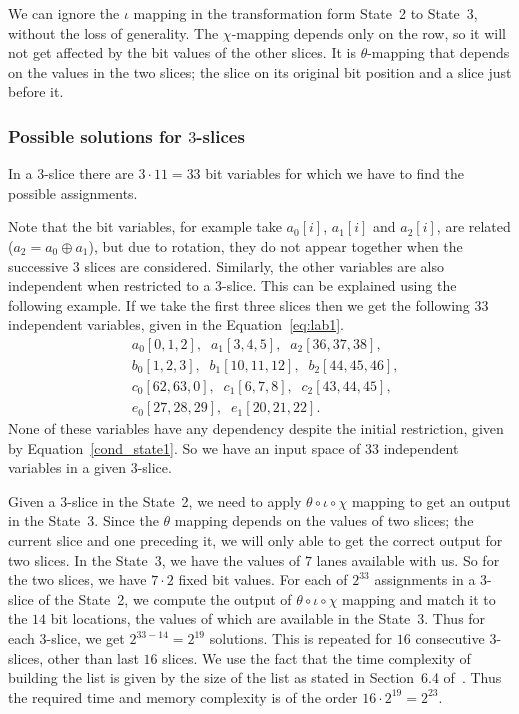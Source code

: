 \documentclass[runningheads]{llncs}
\begin{document}
We can ignore the $\iota$ mapping in the transformation form State~2 to State~3, without the loss of generality. The $\chi$-mapping depends only on the row, so it will not get affected by the bit values of the other slices. It is $\theta$-mapping that depends on the values in the two slices; the slice on its original bit position and a slice just before it.

\subsubsection{Possible solutions for $3$-slices} 
In a $3$-slice there are $3 \cdot 11 = 33$ bit variables for which we have to find the possible assignments. 

Note that the bit variables, for example take $a_0[i]$, $a_1[i]$ and $a_2[i]$, are related ($a_2 = a_0 \oplus a_1$), but due to rotation, they do not 
appear together when the successive $3$ slices are considered.
Similarly, the other variables are also independent when restricted to a $3$-slice.
This can be explained using the following example. If we take the first three slices then we get the following $33$ independent variables, given in the Equation~\ref{eq:lab1}.
\begin{equation}
\label{eq:lab1}
\begin{aligned}
&a_0[0,1,2],\;\;a_1[3,4,5],\;\;a_2[36,37,38],\\
&b_0[1,2,3],\;\; b_1[10,11,12],\;\;b_2[44,45,46],\\
&c_0[62,63,0],\;\;c_1[6,7,8],\;\;c_2[43,44,45],\\
&e_0[27,28,29],\;\; e_1[20,21,22].
\end{aligned}
\end{equation}
None of these variables have any dependency despite the initial restriction, given by Equation~\ref{cond_state1}. So we have an input space of $33$ independent variables in a given $3$-slice. 

Given a $3$-slice in the State~2, we need to apply $\theta \circ \iota \circ \chi$ mapping to get an output in the State~3. Since the $\theta$ mapping depends on the values of two slices; the current slice and one preceding it, we will only able to get the correct output for two slices. In the State~3, we have the values of $7$ lanes available with us. So for the two slices, we have $7\cdot 2$ fixed bit values.
For each of $2^{33}$ assignments in a $3$-slice of the State~2, we compute the output of
$\theta \circ \iota \circ \chi$ mapping and match it to the $14$ bit locations, the values of which are available in the State~3.
Thus for each $3$-slice, we get $2^{33-14} = 2^{19}$ solutions. This is repeated for $16$ consecutive $3$-slices, other than last $16$ slices. We use the fact that the time complexity of building the list is given by the size of the list as stated in Section~6.4 of~\cite{naya2011practical}. Thus the required time and memory complexity is of the order $16 \cdot 2^{19} = 2^{23}$.
\end{document}
